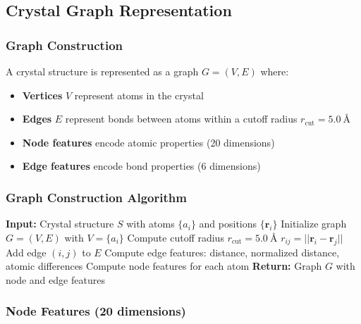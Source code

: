 \documentclass[11pt,a4paper]{article}
\begin{document}
\subsection{Crystal Graph Representation}

\subsubsection{Graph Construction}

A crystal structure is represented as a graph $G = (V, E)$ where:

\begin{itemize}
    \item \textbf{Vertices} $V$ represent atoms in the crystal
    \item \textbf{Edges} $E$ represent bonds between atoms within a cutoff radius $r_{\text{cut}} = \SI{5.0}{\angstrom}$
    \item \textbf{Node features} encode atomic properties (20 dimensions)
    \item \textbf{Edge features} encode bond properties (6 dimensions)
\end{itemize}

\subsubsection{Graph Construction Algorithm}

\begin{algorithm}[H]
\caption{Crystal Structure to Graph Conversion}
\begin{algorithmic}[1]
\State \textbf{Input:} Crystal structure $S$ with atoms $\{a_i\}$ and positions $\{\mathbf{r}_i\}$
\State Initialize graph $G = (V, E)$ with $V = \{a_i\}$
\State Compute cutoff radius $r_{\text{cut}} = \SI{5.0}{\angstrom}$
    \State $r_{ij} = ||\mathbf{r}_i - \mathbf{r}_j||$
        \State Add edge $(i, j)$ to $E$
        \State Compute edge features: distance, normalized distance, atomic differences
    \EndIf
\EndFor
\State Compute node features for each atom
\State \textbf{Return:} Graph $G$ with node and edge features
\end{algorithmic}
\end{algorithm}

\subsubsection{Node Features (20 dimensions)}
\end{document}
